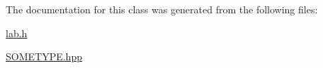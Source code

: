 The documentation for this class was generated from the following files\+:\begin{DoxyCompactItemize}
\item 
\hyperlink{lab_8h}{lab.\+h}\item 
\hyperlink{SOMETYPE_8hpp}{S\+O\+M\+E\+T\+Y\+P\+E.\+hpp}\end{DoxyCompactItemize}

